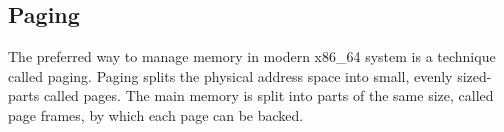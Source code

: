 \subsection{Paging}
\label{sec:state:technical:paging}


The preferred way to manage memory in modern x86\_64 system is a technique
called paging. Paging splits the physical address space into small, evenly
sized-parts called pages. The main memory is split into parts of the same size,
called page frames, by which each page can be backed.

